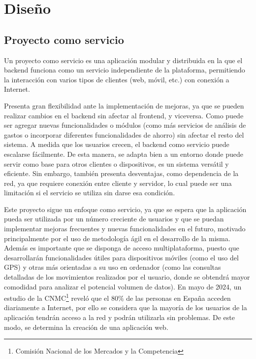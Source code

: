 \chapter{Diseño}\label{chap:diseno}

\section{Proyecto como servicio}
Un proyecto como servicio es una aplicación modular y distribuida en la que el backend funciona como un servicio independiente de la plataforma, permitiendo la interacción con varios tipos de clientes (web, móvil, etc.) con conexión a Internet. 

Presenta gran flexibilidad ante la implementación de mejoras, ya que se pueden realizar cambios en el backend sin afectar al frontend, y viceversa. Como puede ser agregar nuevas funcionalidades o módulos (como más servicios de análisis de gastos o incorporar diferentes funcionalidades de ahorro) sin afectar el resto del sistema. A medida que los usuarios crecen, el backend como servicio puede escalarse fácilmente. De esta manera, se adapta bien a un entorno donde puede servir como base para otros clientes o dispositivos, es un sistema versátil y eficiente. Sin embargo, también presenta desventajas, como dependencia de la red, ya que requiere conexión entre cliente y servidor, lo cual puede ser una limitación si el servicio se utiliza sin darse esa condición\cite{galster2014variability}.

Este proyecto sigue un enfoque como servicio, ya que se espera que la aplicación pueda ser utilizada por un número creciente de usuarios y que se puedan implementar mejoras frecuentes y nuevas funcionalidades en el futuro, motivado principalmente por el uso de metodología ágil en el desarrollo de la misma. Además es importante que se disponga de acceso multiplataforma, puesto que desarrollarán funcionalidades útiles para dispositivos móviles (como el uso del GPS) y otras más orientadas a su uso en ordenador (como las consultas detalladas de los movimientos realizados por el usuario, donde se obtendrá mayor comodidad para analizar el potencial volumen de datos). En mayo de 2024, un estudio de la CNMC\footnote{Comisión Nacional de los Mercados y la Competencia} reveló que el 80\% de las personas en España acceden diariamente a Internet, por ello se considera que la mayoría de los usuarios de la aplicación tendrán acceso a la red y podrán utilizarla sin problemas\cite{cnmc2024}. 
De este modo, se determina la creación de una aplicación web.

